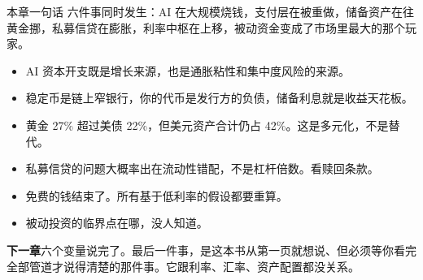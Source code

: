 \begin{takeaway}{本章一句话}
六件事同时发生：AI 在大规模烧钱，支付层在被重做，储备资产在往黄金挪，私募信贷在膨胀，利率中枢在上移，被动资金变成了市场里最大的那个玩家。

\begin{itemize}
  \item AI 资本开支既是增长来源，也是通胀粘性和集中度风险的来源。
  \item 稳定币是链上窄银行，你的代币是发行方的负债，储备利息就是收益天花板。
  \item 黄金 27\% 超过美债 22\%，但美元资产合计仍占 42\%。这是多元化，不是替代。
  \item 私募信贷的问题大概率出在流动性错配，不是杠杆倍数。看赎回条款。
  \item 免费的钱结束了。所有基于低利率的假设都要重算。
  \item 被动投资的临界点在哪，没人知道。
\end{itemize}

\end{takeaway}

\begin{bridgebox}
\textbf{下一章}六个变量说完了。最后一件事，是这本书从第一页就想说、但必须等你看完全部管道才说得清楚的那件事。它跟利率、汇率、资产配置都没关系。
\end{bridgebox}

